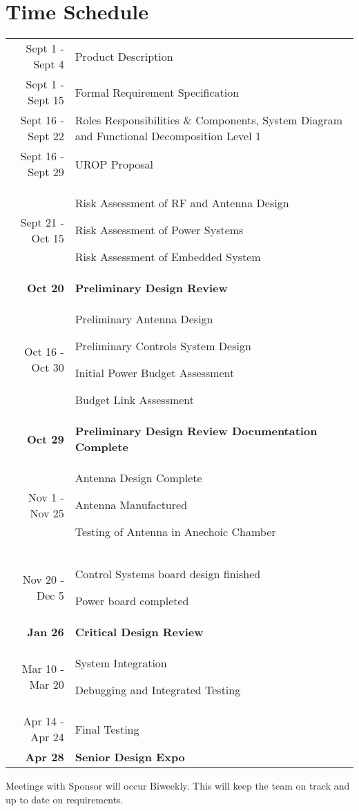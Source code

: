 \documentclass[UROP.tex]{subfiles}
\begin{document}
\bigskip
\section{\Large Time Schedule}
\vspace{-0.2cm}
\begin{table}[H]
\renewcommand\arraystretch{1.4}
\captionsetup{singlelinecheck=false, labelfont=sc, labelsep=quad}
\begin{tabular}{@{\,}r <{\hskip 2pt} !{\foo} >{\raggedright\arraybackslash}p{12cm}}
\toprule
\addlinespace[1.5ex]
Sept 1 - Sept 4 & Product Description\\
Sept 1 - Sept 15 & Formal Requirement Specification \\
Sept 16 - Sept 22 & Roles Responsibilities \& Components,  System Diagram and Functional Decomposition Level 1\\
Sept 16 - Sept 29 & UROP Proposal\\
Sept 21 - Oct 15 & Risk Assessment of RF and Antenna Design

Risk Assessment of Power Systems

Risk Assessment of Embedded System\\
\textbf{Oct 20} & \textbf{Preliminary Design Review}\\
Oct 16 - Oct 30 & Preliminary Antenna Design

Preliminary Controls System Design

Initial Power Budget Assessment

Budget Link Assessment\\
\textbf{Oct 29} & \textbf{Preliminary Design Review Documentation Complete}\\
Nov 1 - Nov 25 & Antenna Design Complete

Antenna Manufactured

Testing of Antenna in Anechoic Chamber\\
Nov 20 - Dec 5 & Control Systems board design finished

Power board completed\\
\textbf{Jan 26} & \textbf{Critical Design Review}\\
Mar 10 - Mar 20 & System Integration 

Debugging and Integrated Testing\\

Apr 14 - Apr 24 & Final Testing\\
\textbf{Apr 28} & \textbf{Senior Design Expo}\\
\end{tabular}
\end{table}
Meetings with Sponsor will occur Biweekly.  This will keep the team on track and up to date on requirements.
\end{document}
